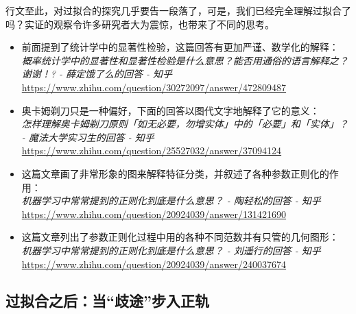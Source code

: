 行文至此，对过拟合的探究几乎要告一段落了，可是，我们已经完全理解过拟合了吗？实证的观察令许多研究者大为震惊，也带来了不同的思考。
\begin{tcolorbox}[myrecommendbox, title=推荐阅读, breakable=false]
    \begin{itemize}
        \item 前面提到了统计学中的显著性检验，这篇回答有更加严谨、数学化的解释：\\
              \textit{概率统计学中的显著性和显著性检验是什么意思？能否用通俗的语言解释之？谢谢！? - 薛定饿了么的回答 - 知乎}\\
              \url{https://www.zhihu.com/question/30272097/answer/472809487}
        \item 奥卡姆剃刀只是一种偏好，下面的回答以图代文字地解释了它的意义：\\
              \textit{怎样理解奥卡姆剃刀原则「如无必要，勿增实体」中的「必要」和「实体」？ - 魔法大学实习生的回答 - 知乎}\\
              \url{https://www.zhihu.com/question/25527032/answer/37094124}
        \item 这篇文章画了非常形象的图来解释特征分类，并叙述了各种参数正则化的作用：\\
              \textit{机器学习中常常提到的正则化到底是什么意思？ - 陶轻松的回答 - 知乎}\\
              \url{https://www.zhihu.com/question/20924039/answer/131421690}
        \item 这篇文章列出了参数正则化过程中用的各种不同范数并有只管的几何图形：\\
              \textit{机器学习中常常提到的正则化到底是什么意思？ - 刘遥行的回答 - 知乎}\\
              \url{https://www.zhihu.com/question/20924039/answer/240037674}
    \end{itemize}
\end{tcolorbox}

\newpage

\subsection{过拟合之后：当“歧途”步入正轨}

